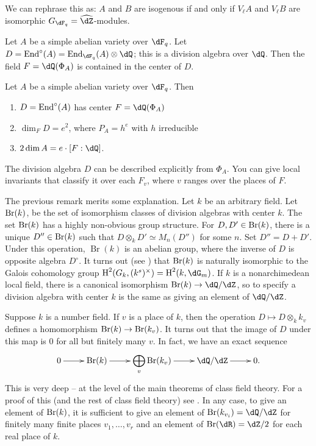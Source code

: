 \documentclass{article}
\begin{document}
We can rephrase this as: $A$ and $B$ are isogenous if and only if 
$V_\ell A$ and $V_\ell B$ are isomorphic $G_{\dF_q}=\widehat\dZ$-modules.

Let $A$ be a simple abelian variety over $\dF_q$. Let 
$D=\End^\circ(A)=\End_{\dF_q}(A)\otimes\dQ$; this is a division algebra over 
$\dQ$. Then the field $F=\dQ(\Phi_A)$ is contained in the 
center of $D$. 

\begin{theorem}
Let $A$ be a simple abelian variety over $\dF_q$. Then 
\begin{enumerate}
  \item $D=\operatorname{End}^\circ(A)$ has center $F=\dQ(\Phi_A)$ 
  \item $\dim_F D = e^2$, where $P_A =h^e$ with $h$ irreducible
  \item $2\dim A = e\cdot [F:\dQ]$. 
\end{enumerate}
\end{theorem}

The division algebra $D$ can be described explicitly from $\Phi_A$. You can 
give local invariants that classify it over each $F_v$, where $v$ ranges over 
the places of $F$. 

The previous remark merits some explanation. Let $k$ be an arbitrary field. 
Let $\operatorname{Br}(k)$, be the set of isomorphism classes of division algebras with 
center $k$. The set $\operatorname{Br}(k)$ has a highly non-obvious group structure. For 
$D,D'\in \operatorname{Br}(k)$, there is a unique $D''\in \operatorname{Br}(k)$ such that 
$D\otimes_k D'\simeq M_n(D'')$ for some $n$. Set $D''=D+D'$. Under this 
operation, $\operatorname{Br}(k)$ is an abelian group, where the inverse of 
$D$ is opposite algebra $D^\circ$. It turns out (see 
\cite[X.5]{se79}) that $\operatorname{Br}(k)$ is naturally isomorphic to the Galois 
cohomology group $\h^2(G_k,(k^s)^\times) = \h^2(k,\dG_m)$. If $k$ is a 
nonarchimedean local field, there is a canonical isomorphism 
$\brauer(k) \to \dQ/\dZ$, so to specify a division algebra with center $k$ is 
the same as giving an element of $\dQ/\dZ$. 

Suppose $k$ is a number field. If $v$ is a place of $k$, then the operation 
$D\mapsto D\otimes_k k_v$ defines a homomorphism $\operatorname{Br}(k) \to \operatorname{Br}(k_v)$. 
It turns out that the image of $D$ under this map is $0$ for all but finitely 
many $v$. In fact, we have an exact sequence
\[\xymatrix{
  0 \ar[r] 
    & \brauer(k) \ar[r] 
    & \displaystyle\bigoplus_v \brauer(k_v) \ar[r] 
    & \dQ/\dZ \ar[r] 
    & 0 \text{.}
}\]
This is very deep -- at the level of the main theorems of class field theory. 
For a proof of this (and the rest of class field theory) see 
\cite[2.86]{sh92}. In any case, to give an element of $\operatorname{Br}(k)$, it is 
sufficient to  give an element of $\brauer(k_{v_i})=\dQ/\dZ$ for finitely many 
finite places $v_1,\dots,v_r$ and an element of $\brauer(\dR)=\dZ/2$ for each 
real place of $k$.
\end{document}
